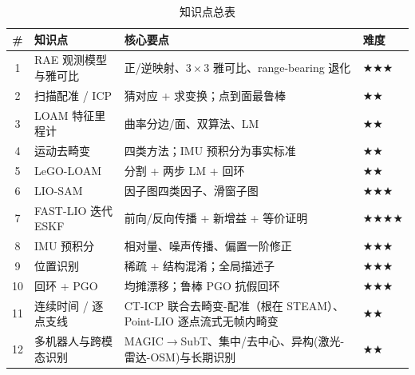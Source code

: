 \begin{table}[H]\centering\small
\caption{知识点总表}
\begin{tabular}{clll}
\toprule
\# & 知识点 & 核心要点 & 难度 \\
\midrule
1 & RAE 观测模型与雅可比 & 正/逆映射、$3\times3$ 雅可比、range-bearing 退化 & $\bigstar\bigstar\bigstar$ \\
2 & 扫描配准 / ICP & 猜对应 + 求变换；点到面最鲁棒 & $\bigstar\bigstar$ \\
3 & LOAM 特征里程计 & 曲率分边/面、双算法、LM & $\bigstar\bigstar$ \\
4 & 运动去畸变 & 四类方法；IMU 预积分为事实标准 & $\bigstar\bigstar$ \\
5 & LeGO-LOAM & 分割 + 两步 LM + 回环 & $\bigstar\bigstar$ \\
6 & LIO-SAM & 因子图四类因子、滑窗子图 & $\bigstar\bigstar\bigstar$ \\
7 & FAST-LIO 迭代 ESKF & 前向/反向传播 + 新增益 + 等价证明 & $\bigstar\bigstar\bigstar\bigstar$ \\
8 & IMU 预积分 & 相对量、噪声传播、偏置一阶修正 & $\bigstar\bigstar\bigstar$ \\
9 & 位置识别 & 稀疏 + 结构混淆；全局描述子 & $\bigstar\bigstar\bigstar$ \\
10 & 回环 + PGO & 均摊漂移；鲁棒 PGO 抗假回环 & $\bigstar\bigstar\bigstar$ \\
11 & 连续时间 / 逐点支线 & CT-ICP 联合去畸变-配准（根在 STEAM）、Point-LIO 逐点流式无帧内畸变 & $\bigstar\bigstar$ \\
12 & 多机器人与跨模态识别 & MAGIC$\to$SubT、集中/去中心、异构(激光-雷达-OSM)与长期识别 & $\bigstar\bigstar$ \\
\bottomrule
\end{tabular}
\end{table}


